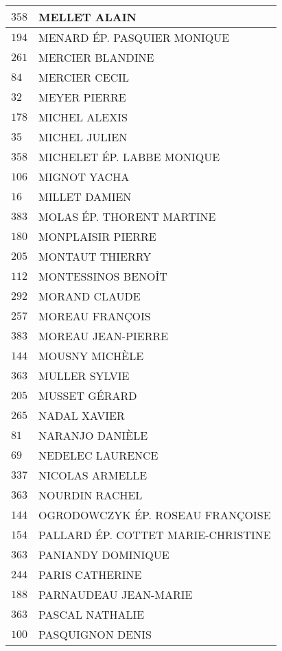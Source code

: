 \begin{xltabular}{\linewidth}{|l|X|}
    $358$ & MELLET ALAIN \\
    \hline
    $194$ & MENARD ÉP. PASQUIER MONIQUE \\
    \hline
    $261$ & MERCIER BLANDINE \\
    \hline
    $84$ & MERCIER CECIL \\
    \hline
    $32$ & MEYER PIERRE \\
    \hline
    $178$ & MICHEL ALEXIS \\
    \hline
    $35$ & MICHEL JULIEN \\
    \hline
    $358$ & MICHELET ÉP. LABBE MONIQUE \\
    \hline
    $106$ & MIGNOT YACHA \\
    \hline
    $16$ & MILLET DAMIEN \\
    \hline
    $383$ & MOLAS ÉP. THORENT MARTINE \\
    \hline
    $180$ & MONPLAISIR PIERRE \\
    \hline
    $205$ & MONTAUT THIERRY \\
    \hline
    $112$ & MONTESSINOS BENOÎT \\
    \hline
    $292$ & MORAND CLAUDE \\
    \hline
    $257$ & MOREAU FRANÇOIS \\
    \hline
    $383$ & MOREAU JEAN-PIERRE \\
    \hline
    $144$ & MOUSNY MICHÈLE \\
    \hline
    $363$ & MULLER SYLVIE \\
    \hline
    $205$ & MUSSET GÉRARD \\
    \hline
    $265$ & NADAL XAVIER \\
    \hline
    $81$ & NARANJO DANIÈLE \\
    \hline
    $69$ & NEDELEC LAURENCE \\
    \hline
    $337$ & NICOLAS ARMELLE \\
    \hline
    $363$ & NOURDIN RACHEL \\
    \hline
    $144$ & OGRODOWCZYK ÉP. ROSEAU FRANÇOISE \\
    \hline
    $154$ & PALLARD ÉP. COTTET MARIE-CHRISTINE \\
    \hline
    $363$ & PANIANDY DOMINIQUE \\
    \hline
    $244$ & PARIS CATHERINE \\
    \hline
    $188$ & PARNAUDEAU JEAN-MARIE \\
    \hline
    $363$ & PASCAL NATHALIE \\
    \hline
    $100$ & PASQUIGNON DENIS \\

\end{xltabular}
